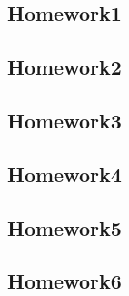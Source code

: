 \documentclass[../main.tex]{subfiles}
\begin{document}
\subsection{Homework1}

\newpage

\subsection{Homework2}

\newpage

\subsection{Homework3}

\newpage

\subsection{Homework4}

\newpage

\subsection{Homework5}

\newpage

\subsection{Homework6}

\newpage
\end{document}
